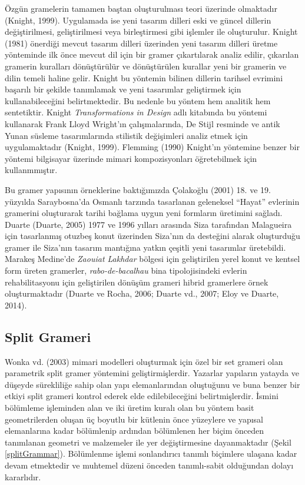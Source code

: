 \documentclass[12pt,turkish,a4paperpaper,]{report}
\begin{document}
Özgün gramelerin tamamen baştan oluşturulması teori üzerinde olmaktadır
(Knight, 1999). Uygulamada ise yeni tasarım dilleri eski ve güncel
dillerin değiştirilmesi, geliştirilmesi veya birleştirmesi gibi işlemler
ile oluşturulur. Knight (1981) önerdiği mevcut tasarım dilleri üzerinden
yeni tasarım dilleri üretme yönteminde ilk önce mevcut dil için bir
gramer çıkartılarak analiz edilir, çıkarılan gramerin kuralları
dönüştürülür ve dönüştürülen kurallar yeni bir gramerin ve dilin temeli
haline gelir. Knight bu yöntemin bilinen dillerin tarihsel evrimini
başarılı bir şekilde tanımlamak ve yeni tasarımlar geliştirmek için
kullanabileceğini belirtmektedir. Bu nedenle bu yöntem hem analitik hem
sentetiktir. Knight \emph{Transformations in Design} adlı kitabında bu
yöntemi kullanarak Frank Lloyd Wright'ın çalışmalarında, De Stijl
resminde ve antik Yunan süsleme tasarımlarında stilistik değişimleri
analiz etmek için uygulamaktadır (Knight, 1999). Flemming (1990)
Knight'ın yöntemine benzer bir yöntemi bilgisayar üzerinde mimari
kompozisyonları öğretebilmek için kullanmmıştır.

Bu gramer yapısının örneklerine baktığımızda Çolakoğlu (2001) 18. ve 19.
yüzyılda Saraybosna'da Osmanlı tarzında tasarlanan geleneksel ``Hayat''
evlerinin gramerini oluşturarak tarihi bağlama uygun yeni formların
üretimini sağladı. Duarte (Duarte, 2005) 1977 ve 1996 yılları arasında
Siza tarafından Malagueira için tasarlanmış otuzbeş konut üzerinden
Siza'nın da desteğini alarak oluşturduğu gramer ile Siza'nın tasarım
mantığına yatkın çeşitli yeni tasarımlar üretebildi. Marakeş Medine'de
\emph{Zaouiat Lakhdar} bölgesi için geliştirilen yerel konut ve kentsel
form üreten gramerler, \emph{rabo-de-bacalhau} bina tipolojisindeki
evlerin rehabilitasyonu için geliştirilen dönüşüm grameri hibrid
gramerlere örnek oluşturmaktadır (Duarte ve Rocha, 2006; Duarte vd.,
2007; Eloy ve Duarte, 2014).

\hypertarget{split-grameri}{%
\subsection{Split Grameri}\label{split-grameri}}

Wonka vd. (2003) mimari modelleri oluşturmak için özel bir set grameri
olan parametrik split gramer yöntemini geliştirmişlerdir. Yazarlar
yapıların yatayda ve düşeyde sürekliliğe sahip olan yapı elemanlarından
oluştuğunu ve buna benzer bir etkiyi split grameri kontrol ederek elde
edilebileceğini belirtmişlerdir. İsmini bölümleme işleminden alan ve iki
üretim kuralı olan bu yöntem basit geometrilerden oluşan üç boyutlu bir
kütlenin önce yüzeylere ve yapısal elemanlarına kadar bölümlenip
ardından bölümlenen her biçim önceden tanımlanan geometri ve malzemeler
ile yer değiştirmesine dayanmaktadır (Şekil \ref{splitGrammar}).
Bölümlenme işlemi sonlandırıcı tanımlı biçimlere ulaşana kadar devam
etmektedir ve muhtemel düzeni önceden tanımlı-sabit olduğundan dolayı
kararlıdır.
\end{document}
